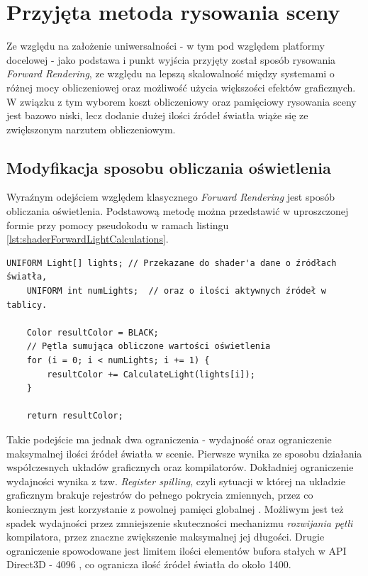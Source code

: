 \chapter{Przyjęta metoda rysowania sceny}
\label{ChapterSceneDrawingMethod}
	Ze względu na założenie uniwersalności - w tym pod względem platformy docelowej - jako podstawa i punkt wyjścia przyjęty został sposób rysowania \textit{Forward Rendering}, ze względu na lepszą skalowalność między systemami o różnej mocy obliczeniowej oraz możliwość użycia większości efektów graficznych. W związku z tym wyborem koszt obliczeniowy oraz pamięciowy rysowania sceny jest bazowo niski, lecz dodanie dużej ilości źródeł światła wiąże się ze zwiększonym narzutem obliczeniowym.
	
\section{Modyfikacja sposobu obliczania oświetlenia}
	Wyraźnym odejściem względem klasycznego \textit{Forward Rendering} jest sposób obliczania oświetlenia. Podstawową metodę można przedstawić w uproszczonej formie przy pomocy pseudokodu w ramach listingu \ref{lst:shaderForwardLightCalculations}.
	
	\begin{lstlisting}[caption={Pseudokod programu cieniującego obliczającego oświetlenie metodą Forward Rendering}, label={lst:shaderForwardLightCalculations}]
	UNIFORM Light[] lights; // Przekazane do shader'a dane o źródłach światła,
	UNIFORM int numLights;  // oraz o ilości aktywnych źródeł w tablicy.
		
	Color resultColor = BLACK;
	// Pętla sumująca obliczone wartości oświetlenia
	for (i = 0; i < numLights; i += 1) {
		resultColor += CalculateLight(lights[i]);
	}
	
	return resultColor; 
	\end{lstlisting}
	
	Takie podejście ma jednak dwa ograniczenia - wydajność oraz ograniczenie maksymalnej ilości źródeł światła w scenie.	Pierwsze wynika ze sposobu działania współczesnych układów graficznych oraz kompilatorów. Dokładniej ograniczenie wydajności wynika z tzw. \textit{Register spilling}, czyli sytuacji w której na układzie graficznym brakuje rejestrów do pełnego pokrycia zmiennych, przez co koniecznym jest korzystanie z powolnej pamięci globalnej \cite{amd:gpuopen:RegisterSpilling}. Możliwym jest też spadek wydajności przez zmniejszenie skuteczności mechanizmu \textit{rozwijania pętli} kompilatora, przez znaczne zwiększenie maksymalnej jej długości. Drugie ograniczenie spowodowane jest limitem ilości elementów bufora stałych w API Direct3D - 4096 \cite{microsoft:Direct3D11:ResourceLimits}, co ogranicza ilość źródeł światła do około 1400. 
	
